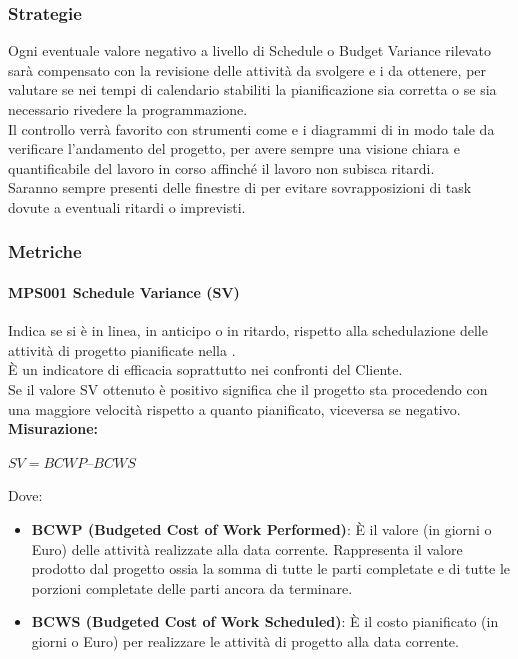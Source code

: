 \documentclass[NormeDiProgetto.tex]{subfiles}
\begin{document}
	\subsubsection{Strategie}
	Ogni eventuale valore negativo a livello di Schedule o Budget Variance rilevato sarà compensato con la revisione delle attività da svolgere e i  da ottenere, per valutare se nei tempi di calendario stabiliti la pianificazione sia corretta o se sia necessario rivedere la programmazione.\\
	Il controllo verrà favorito con strumenti come  e i diagrammi di  in modo tale da verificare l'andamento del progetto, per avere sempre una visione chiara e quantificabile del lavoro in corso affinché il lavoro non subisca ritardi.\\
	Saranno sempre presenti delle finestre di  per evitare sovrapposizioni di task dovute a eventuali ritardi o imprevisti. 
	
	\subsubsection{Metriche} 
	\paragraph{MPS001 Schedule Variance (SV)}
	Indica se si è in linea, in anticipo o in ritardo, rispetto alla schedulazione delle attività di progetto pianificate nella .\\
	È un indicatore di efficacia soprattutto nei confronti del Cliente. \\
	Se il valore SV ottenuto è positivo significa che il progetto sta procedendo con una maggiore velocità rispetto a quanto pianificato, viceversa se negativo.\\
	\textbf{Misurazione:}
	\begin{center}
		$ SV = BCWP – BCWS $
	\end{center}
	Dove: \begin{itemize}
		\item \textbf{BCWP (Budgeted Cost of Work Performed)}: \`{E} il valore (in giorni o Euro) delle attività realizzate alla data corrente.
		Rappresenta il valore prodotto dal progetto ossia la somma di tutte le parti completate e di tutte le porzioni completate delle parti ancora da terminare.
		\item \textbf{BCWS (Budgeted Cost of Work Scheduled)}: \`{E} il costo pianificato (in giorni o Euro) per realizzare le attività di progetto alla data corrente.
	\end{itemize}
	
\end{document}
